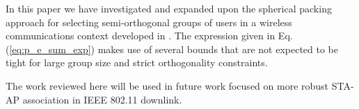 In this paper we have investigated and expanded upon the spherical packing approach for selecting semi-orthogonal groups of users in a wireless communications context developed in \cite{Swannack2005}. The expression given in Eq. (\ref{eq:p_e_sum_exp}) makes use of several bounds that are not expected to be tight for large group size and strict orthogonality constraints.

The work reviewed here will be used in future work focused on more robust STA-AP association in IEEE 802.11 downlink.